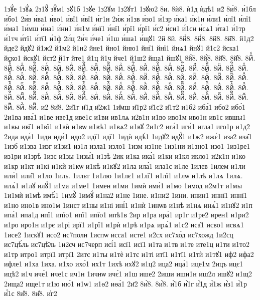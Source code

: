 {1зꙋ́е
1зꙋ́ѧ
2з1ꙋ̑
зꙋ̑м1
зꙋ1б
1зꙋе
1з2ꙋм
1з2ꙋт1
1зꙋю2
8и.
8ѝ8.
ѝ1д
ѝдѣ1
и2́
8и́8.
и́1бл
и́бо1
2и́в
и́ва1
и́во1
и́вї1
и́вї1
и́г1н
2и́ж
и́1зв
и́зо1
и́1зр
и́ка1
и́к1н
и́ли1
и́лї1
и́лї1
и́ма1
1и́мш
и́на1
и́ни1
и́н1м
и́нї1
и́нї1
и́рї1
и́рї1
и́с2
и́си1
и́1сн
и́сѧ1
и́та1
и́1тр
и́1тч
и́тї1
и́тї1
и́1ф
2и́ц
2и́ч
и́че1
и́1ш
и́ша1
и́щꙋ1
2й
8й.
8й̀8.
8й́8.
8й̈8.
8й̑8.
й1д2
йде2
йдꙋ2
й1ж2
й1м2
й1н2
йне1
йно1
йню1
йнї1
йнї1
йнѧ1
йнꙋ1
й1с2
йска1
йско1
йскꙋ1
йст2
й1т
йте1
й1ц
й1ч
йче1
й1ш2
йша1
йшꙋ1
8й҆̀8.
8й҆́8.
8й҆̈8.
8й҆̑8.
8йⷠ.
8йⷠ҇.
8йⷡ.
8йⷡ҇.
8йⷢ.
8йⷢ҇.
8йⷣ.
8йⷣ҇.
8йⷤ.
8йⷤ҇.
8йⷥ.
8йⷥ҇.
8йⷦ.
8йⷦ҇.
8йⷧ.
8йⷧ҇.
8йⷨ.
8йⷨ҇.
8йⷩ.
8йⷩ҇.
8йⷪ.
8йⷪ҇.
8йⷫ.
8йⷫ҇.
8йⷬ.
8йⷬ҇.
8йⷭ.
8йⷭ҇.
8йⷮ.
8йⷮ҇.
8йⷯ.
8йⷯ҇.
8йⷰ.
8йⷰ҇.
8йⷱ.
8йⷱ҇.
8йⷲ.
8йⷲ҇.
8йⷳ.
8йⷳ҇.
8йⷴ.
8йⷴ҇.
8йⷵ.
8йⷵ҇.
8йⷶ.
8йⷶ҇.
8йⷷ.
8йⷷ҇.
8йⷸ.
8йⷸ҇.
8йⷹ.
8йⷹ҇.
8йⷺ.
8йⷺ҇.
8йⷻ.
8йⷻ҇.
8йⷼ.
8йⷼ҇.
8йⷽ.
8йⷽ҇.
8йⷾ.
8йⷾ҇.
8йⷿ.
8йⷿ҇.
8йꙴ.
8йꙴ҇.
8йꙵ.
8йꙵ҇.
8йꙶ.
8йꙶ҇.
8йꙷ.
8йꙷ҇.
8йꙸ.
8йꙸ҇.
8йꙹ.
8йꙹ҇.
8йꙺ.
8йꙺ҇.
8йꙻ.
8йꙻ҇.
8й꙼.
8й꙼҇.
8й꙽.
8й꙽҇.
и2̑
8и̑8.
2и̑1г
и̑1д
и̑2ж1
1и̑мш
и̑1р2
и̑1с2
и̑1т2
и1б2
иба́1
ибо2
ибо́1
2и1ва
ива́1
и1ве
иве1д
иве1с
и1ви
ив1лѧ
и2в1н
и1во
иво1м
иво1н
ив1с
ившы1
и1вы
ивї1
и1вї1
и1вѝ
и1вѡ
и1вѣ1
и1вѧ2
и1вꙋ
2и1г2
ига́1
иги́1
игла1
иго1р
и1д2
2ида
ида́1
1иди
иди́1
идо2
идї1
идї1
1идѝ
идѣ́1
1идꙋ2
идꙋ́1
и1ж2
ижє́1
иза2
иза̑1
1изб
и1зва
1изг
и1зи1
из1л
изла1
изло1
1изм
из1не
1из1ни
и1зно1
изо1
1из1ре1
из1ри
и1зрѣ
1изс
и1зы
1изы́1
и1зѣ
2ик
и1ка
ика́1
и1ки
и1кл
икло1
и2к1н
и1ко
и1кр
и1кт
и1кі
и1кѝ
и1кѡ
и1кѣ
и1кꙋ2
и1ла
ила́1
ила1с
и1ле
1илев
1илем
и1ли
или́1
или̑1
и1ло
1иль.
1ильт
1и1лю
1и1лє1
и1лї1
и1лї1
и1лѡ
и1лѣ
и1лѧ
1илѧ.
илѧ́1
и1лꙋ
илꙋ́1
и1ма
и1ме1
1имен
и1ми
1имѝ
ими́1
и1мо
1имод
и2м1т
и1мы
1и1мѝ
и1мѣ
имѣ́1
1имꙋ̀
1имꙋ́
и1на2
и1не
1ине.
и1ни2
1ини.
инин1
иннї1
иннї1
и1но
ино1в
ино1м
1инст
и1ны
и1ні
ині́1
и1нѝ
1инѡв
и1нѣ
и1нѧ
инѧ́1
и1нꙋ2
и1п
ипа́1
ипа1д
ипї1
ипїо1
ипї1
ипїо1
ипѣ1в
2ир
и1ра
ира́1
ир1г
и1ре2
ирен1
и1ри2
и1ро
иро1н
и1рє
и1рі
ирї1
и1рї1
и1рѝ
и1рѣ
и1рѧ
ирѧ́1
и1с2
иса̑1
исво1
исвѧ1
1исе2
1искꙋ1
исо2
ис7полн
1испѡ
исса1
исте1
и2сх
ис7хо́д
ис7хожд
1и2сц
ис7цѣ́ль
ис7цѣ̑ль
1и2сч
ис7черп
исі́1
исї1
исї1
и1та
и1тв
и1те
ите1ц
и1ти
и1то2
и1тр
итро1
итрї1
итрї1
2итс
и1ты
и1тѐ
и1тє
и1ті
итї1
и1тї1
и1тѝ
и1тꙋ1
иф2
ифа2
ифле1
и1ха
1иха.
и1хо
ихо́1
их1т
1ихѣ
ихꙋ2
и1ц2
ица2
ица́1
ице1м
2ицъ
ицє1
ицѣ2
и1ч
иче́1
иче1с
ич1н
1ичнѡ
ичє́1
и1ш
ише2
2иши
иши1н
иш2л
ишꙋ2
и1щ2
2ища2
ище1т
и1ю
ию́1
и1ѡ1
и1ѳ2
иѳа́1
2и҃2
8и҆̀8.
8и҆́8.
и҆́1б
и҆́1г
и҆́1д
и҆́1ж
и҆́з1
и҆́1р
и҆́1с
8и҆̈8.
8и҆̑8.
и҆г2
}
